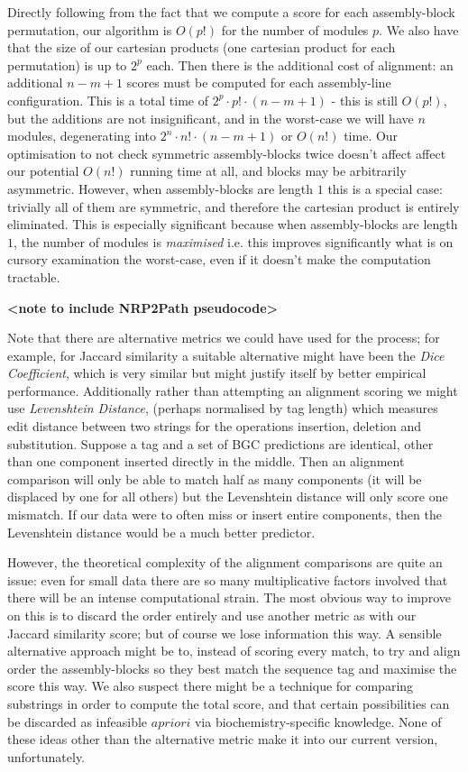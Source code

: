 \documentclass{l4proj}
\newcommand{\cit}[1]{\citep{#1}}
\begin{document}
Directly following from the fact that we compute a score for each assembly-block permutation, our algorithm is \(O(p!)\) for the number of modules \(p\). We also have that the size of our cartesian products (one cartesian product for each permutation) is up to \(2^p\) each. Then there is the additional cost of alignment: an additional \(n-m+1\) scores must be computed for each assembly-line configuration. This is a total time of \(2^{p}\cdot{p!}\cdot(n-m+1)\) - this is still \(O(p!)\), but the additions are not insignificant, and in the worst-case we will have \(n\) modules, degenerating into \(2^{n}\cdot{n!}\cdot(n-m+1)\) or \(O(n!)\) time. Our optimisation to not check symmetric assembly-blocks twice doesn't affect affect our potential \(O(n!)\) running time at all, and blocks may be arbitrarily asymmetric. However, when assembly-blocks are length \(1\) this is a special case: trivially all of them are symmetric, and therefore the cartesian product is entirely eliminated. This is especially significant because when assembly-blocks are length \(1\), the number of modules is \textit{maximised} i.e. this improves significantly what is on cursory examination the worst-case, even if it doesn't make the computation tractable.

\textbf{<note to include NRP2Path pseudocode>}

Note that there are alternative metrics we could have used for the process; for example, for Jaccard similarity a suitable alternative might have been the \textit{Dice Coefficient}, \cit{Dice} which is very similar but might justify itself by better empirical performance. Additionally rather than attempting an alignment scoring we might use \textit{Levenshtein Distance}, \cit{levenshtein} (perhaps normalised by tag length) which measures edit distance between two strings for the operations insertion, deletion and substitution. Suppose a tag and a set of BGC predictions are identical, other than one component inserted directly in the middle. Then an alignment comparison will only be able to match half as many components (it will be displaced by one for all others) but the Levenshtein distance will only score one mismatch. If our data were to often miss or insert entire components, then the Levenshtein distance would be a much better predictor.

However, the theoretical complexity of the alignment comparisons are quite an issue: even for small data there are so many multiplicative factors involved that there will be an intense computational strain. The most obvious way to improve on this is to discard the order entirely and use another metric as with our Jaccard similarity score; but of course we lose information this way. A sensible alternative approach might be to, instead of scoring every match, to try and align order the assembly-blocks so they best match the sequence tag and maximise the score this way. We also suspect there might be a technique for comparing substrings in order to compute the total score, and that certain possibilities can be discarded as infeasible \(a priori\) via biochemistry-specific knowledge. None of these ideas other than the alternative metric make it into our current version, unfortunately.
\end{document}
